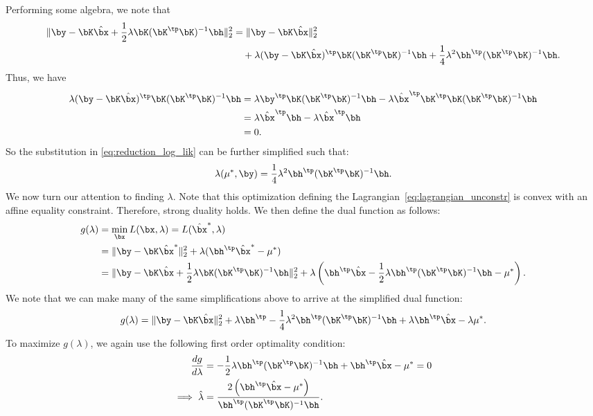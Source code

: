 \documentclass[11pt]{article}
\numberwithin{equation}{section}
\numberwithin{figure}{section}
\begin{document}
Performing some algebra, we note that
\begin{align*}
    \lVert \by - \bK \hat{\bx} + \frac{1}{2} \lambda \bK(\bK^\tp \bK)^{-1} \bh \rVert^2_2 &= \lVert \by - \bK \hat{\bx} \rVert_2^2 \\
    & \quad + \lambda (\by - \bK \hat{\bx})^\tp \bK (\bK^\tp \bK)^{-1} \bh + \frac{1}{4} \lambda^2 \bh^\tp (\bK^\tp \bK)^{-1} \bh.
\end{align*}
Thus, we have
\begin{align*}
    \lambda ( \by - \bK \hat{\bx} )^\tp \bK (\bK^\tp \bK)^{-1} \bh &= \lambda \by^\tp \bK (\bK^\tp \bK)^{-1} \bh - \lambda \hat{\bx}^\tp \bK^\tp \bK (\bK^\tp \bK)^{-1} \bh \\
    &= \lambda \hat{\bx}^\tp \bh - \lambda \hat{\bx}^\tp \bh \\
    &= 0.
\end{align*}
So the substitution in \eqref{eq:reduction_log_lik} can be further simplified such that:
\begin{equation} \label{eq:simplified_log_lik_unconstr}
    \lambda(\mu^*, \by) = \frac{1}{4} \lambda^2 \bh^\tp (\bK^\tp \bK)^{-1} \bh.
\end{equation}
We now turn our attention to finding $\lambda$. Note that this optimization defining the Lagrangian~\eqref{eq:lagrangian_unconstr} is convex with an affine equality constraint. 
Therefore, strong duality holds. We then define the dual function as follows:
\begin{align}
    g(\lambda) &= \min_{\bx} L(\bx, \lambda) = L(\hat{\bx}^*, \lambda) \nonumber \\
    &= \lVert \by - \bK \hat{\bx}^* \rVert^2_2 + \lambda (\bh^\tp \hat{\bx}^* - \mu^*) \nonumber \\
    &= \lVert \by - \bK \hat{\bx} + \frac{1}{2} \lambda \bK(\bK^\tp \bK)^{-1} \bh \rVert^2_2 + \lambda \left(\bh^\tp \hat{\bx} - \frac{1}{2} \lambda \bh^\tp (\bK^\tp \bK)^{-1} \bh - \mu^* \right). 
\end{align}
We note that we can make many of the same simplifications above to arrive at the simplified dual function:
\begin{equation}
    g(\lambda) = \lVert \by - \bK \hat{\bx} \rVert_2^2 + \lambda \bh^\tp - \frac{1}{4} \lambda^2 \bh^\tp (\bK^\tp \bK)^{-1} \bh + \lambda \bh^\tp \hat{\bx} - \lambda \mu^*.
\end{equation}
To maximize $g(\lambda)$, we again use the following first order optimality condition:
\begin{align}
    \frac{d g}{d \lambda} &= - \frac{1}{2} \lambda \bh^\tp (\bK^\tp \bK)^{-1} \bh + \bh^\tp \hat{\bx} - \mu^* = 0 \nonumber \\
    \implies \hat{\lambda} &= \frac{2 \left( \bh^\tp \hat{\bx} - \mu^* \right)}{\bh^\tp (\bK^\tp \bK)^{-1} \bh}. \label{eq:lambda_hat_unconstr}
\end{align}
\end{document}
